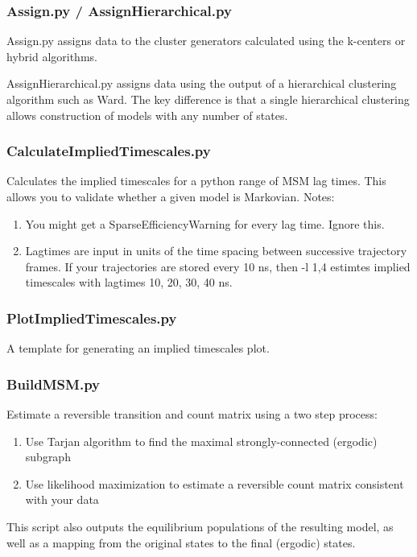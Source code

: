 \documentclass[12pt]{article}
\begin{document}
\subsubsection{Assign.py / AssignHierarchical.py}
Assign.py assigns data to the cluster generators calculated using the k-centers or hybrid algorithms.

AssignHierarchical.py assigns data using the output of a hierarchical clustering algorithm such as Ward.  The key difference is that a single hierarchical clustering allows construction of models with any number of states.

\subsubsection{CalculateImpliedTimescales.py}
Calculates the implied timescales for a python range of MSM lag times.  This allows you to validate whether a given model is Markovian.  
	Notes:
\begin{enumerate}
 \item You might get a SparseEfficiencyWarning for every lag time. Ignore this.
 \item Lagtimes are input in units of the time spacing between successive trajectory frames.  If your trajectories are stored every 10 ns, then -l 1,4 estimtes implied timescales with lagtimes 10, 20, 30, 40 ns.  
\end{enumerate}

\subsubsection{PlotImpliedTimescales.py}
A template for generating an implied timescales plot.

\subsubsection{BuildMSM.py}
Estimate a reversible transition and count matrix using a two step process:
\begin{enumerate}
 \item Use Tarjan algorithm to find the maximal strongly-connected (ergodic) subgraph
 \item Use likelihood maximization to estimate a reversible count matrix consistent with your data
\end{enumerate}

This script also outputs the equilibrium populations of the resulting model, as well as a mapping from the original states to the final (ergodic) states.
\end{document}
